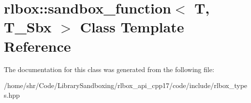 \hypertarget{classrlbox_1_1sandbox__function}{}\section{rlbox\+:\+:sandbox\+\_\+function$<$ T, T\+\_\+\+Sbx $>$ Class Template Reference}
\label{classrlbox_1_1sandbox__function}


The documentation for this class was generated from the following file\+:\begin{DoxyCompactItemize}
\item 
/home/shr/\+Code/\+Library\+Sandboxing/rlbox\+\_\+api\+\_\+cpp17/code/include/rlbox\+\_\+types.\+hpp\end{DoxyCompactItemize}
